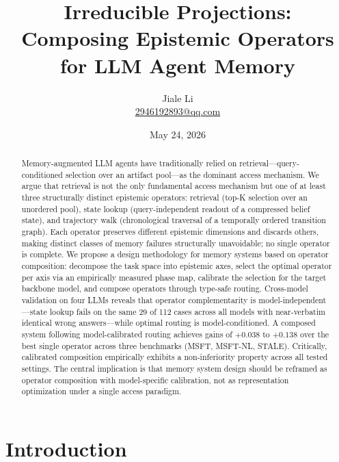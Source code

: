 \documentclass[letterpaper,twocolumn,10pt]{article}
\title{Irreducible Projections:\\Composing Epistemic Operators for LLM Agent Memory}
\author{Jiale Li\\\href{mailto:2946192893@qq.com}{2946192893@qq.com}}
\date{May 24, 2026}
\begin{document}
\maketitle
\thispagestyle{empty}

\begin{abstract}
Memory-augmented LLM agents have traditionally relied on retrieval---query-conditioned selection over an artifact pool---as the dominant access mechanism. We argue that retrieval is not the only fundamental access mechanism but one of at least three structurally distinct epistemic operators: retrieval (top-K selection over an unordered pool), state lookup (query-independent readout of a compressed belief state), and trajectory walk (chronological traversal of a temporally ordered transition graph). Each operator preserves different epistemic dimensions and discards others, making distinct classes of memory failures structurally unavoidable; no single operator is complete. We propose a design methodology for memory systems based on operator composition: decompose the task space into epistemic axes, select the optimal operator per axis via an empirically measured phase map, calibrate the selection for the target backbone model, and compose operators through type-safe routing. Cross-model validation on four LLMs reveals that operator complementarity is model-independent---state lookup fails on the same 29 of 112 cases across all models with near-verbatim identical wrong answers---while optimal routing is model-conditioned. A composed system following model-calibrated routing achieves gains of $+0.038$ to $+0.138$ over the best single operator across three benchmarks (MSFT, MSFT-NL, STALE). Critically, calibrated composition empirically exhibits a non-inferiority property across all tested settings. The central implication is that memory system design should be reframed as operator composition with model-specific calibration, not as representation optimization under a single access paradigm.
\end{abstract}

\section{Introduction}
\end{document}

